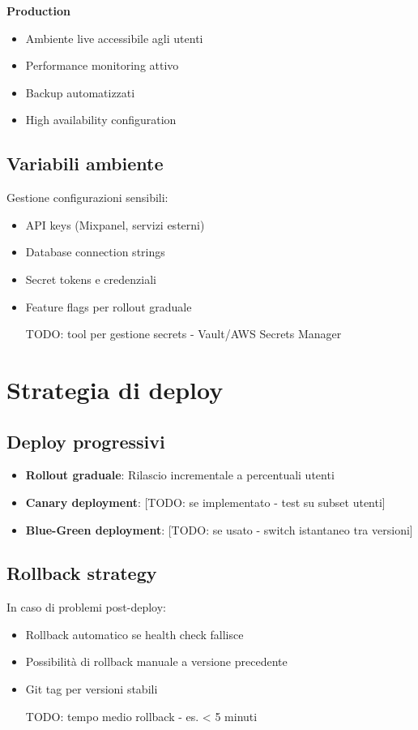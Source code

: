 \textbf{Production}
\begin{itemize}
  \item Ambiente live accessibile agli utenti
  \item Performance monitoring attivo
  \item Backup automatizzati
  \item High availability configuration
\end{itemize}

\subsection{Variabili ambiente}
Gestione configurazioni sensibili:
\begin{itemize}
  \item API keys (Mixpanel, servizi esterni)
  \item Database connection strings
  \item Secret tokens e credenziali
  \item Feature flags per rollout graduale
  \item [TODO: tool per gestione secrets - Vault/AWS Secrets Manager]
\end{itemize}

\section{Strategia di deploy}
\subsection{Deploy progressivi}
\begin{itemize}
  \item \textbf{Rollout graduale}: Rilascio incrementale a percentuali utenti
  \item \textbf{Canary deployment}: [TODO: se implementato - test su subset utenti]
  \item \textbf{Blue-Green deployment}: [TODO: se usato - switch istantaneo tra versioni]
\end{itemize}

\subsection{Rollback strategy}
In caso di problemi post-deploy:
\begin{itemize}
  \item Rollback automatico se health check fallisce
  \item Possibilità di rollback manuale a versione precedente
  \item Git tag per versioni stabili
  \item [TODO: tempo medio rollback - es. < 5 minuti]
\end{itemize}

